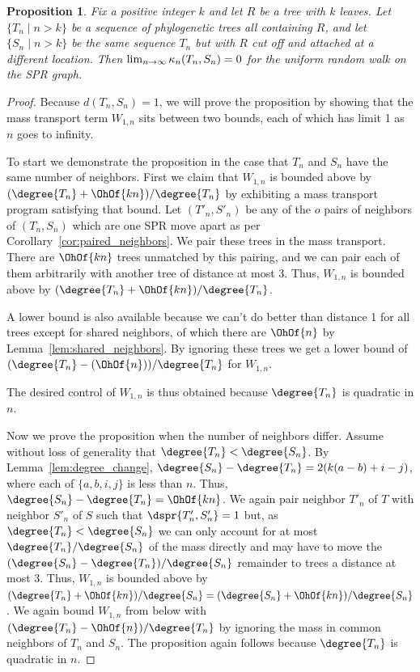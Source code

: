 \documentclass[11pt,onecolumn,conference]{IEEEtran}
\newtheorem{proposition}[theorem]{Proposition}
\newcommand{\curvature}[2][]{%
    \ifthenelse{\equal{#1}{}}%
		{\kappa_n(#2)}%
		{\kappa_n(#1;#2)}%
}
\begin{document}
\begin{proposition}
Fix a positive integer $k$ and let $R$ be a tree with $k$ leaves.
Let $\{T_n \mid n > k\}$ be a sequence of phylogenetic trees all containing $R$, and let $\{S_n \mid n > k\}$ be the same sequence $T_n$ but with $R$ cut off and attached at a different location.
Then $\lim_{n \rightarrow \infty} \curvature{T_n,S_n} = 0$ for the uniform random walk on the SPR graph.
\end{proposition}
\begin{proof}
Because $d(T_n, S_n) = 1$, we will prove the proposition by showing that the mass transport term $W_{1,n}$ sits between two bounds, each of which has limit 1 as $n$ goes to infinity.

To start we demonstrate the proposition in the case that $T_n$ and $S_n$ have the same number of neighbors.
First we claim that $W_{1,n}$ is bounded above by $(\degree{T_n}+\OhOf{kn})/\degree{T_n}$ by exhibiting a mass transport program satisfying that bound.
Let $(T'_n, S'_n)$ be any of the $o$ pairs of neighbors of $(T_n, S_n)$ which are one SPR move apart as per Corollary~\ref{cor:paired_neighbors}.
We pair these trees in the mass transport.
There are $\OhOf{kn}$ trees unmatched by this pairing, and we can pair each of them arbitrarily with another tree of distance at most 3.
Thus, $W_{1,n}$ is bounded above by $(\degree{T_n} + \OhOf{kn}) / \degree{T_n}$.

A lower bound is also available because we can't do better than distance 1 for all trees except for shared neighbors, of which there are $\OhOf{n}$ by Lemma~\ref{lem:shared_neighbors}.
By ignoring these trees we get a lower bound of $(\degree{T_n} - (\OhOf{n}))/\degree{T_n}$ for $W_{1,n}$.

The desired control of $W_{1,n}$ is thus obtained because $\degree{T_n}$ is quadratic in $n$.

Now we prove the proposition when the number of neighbors differ.
Assume without loss of generality that $\degree{T_n} < \degree{S_n}$.
By Lemma~\ref{lem:degree_change}, $\degree{S_n} - \degree{T_n} = 2(k(a-b) + i - j)$, where each of $\{a,b,i,j\}$ is less than $n$.
Thus, $\degree{S_n} - \degree{T_n} = \OhOf{kn}$.
We again pair neighbor $T'_n$ of $T$ with neighbor $S'_n$ of $S$ such that $\dspr{T'_n, S'_n}=1$ but, as $\degree{T_n} < \degree{S_n}$ we can only account for at most $\degree{T_n} / \degree{S_n}$ of the mass directly and may have to move the $(\degree{S_n} - \degree{T_n}) / \degree{S_n}$ remainder to trees a distance at most 3.
Thus, $W_{1,n}$ is bounded above by $(\degree{T_n} + \OhOf{kn}) / \degree{S_n} = (\degree{S_n} + \OhOf{kn}) / \degree{S_n}$.
We again bound $W_{1,n}$ from below with $(\degree{T_n} - \OhOf{n}) / \degree{T_n}$ by ignoring the mass in common neighbors of $T_n$ and $S_n$.
The proposition again follows because $\degree{T_n}$ is quadratic in $n$.

\end{proof}
\end{document}
